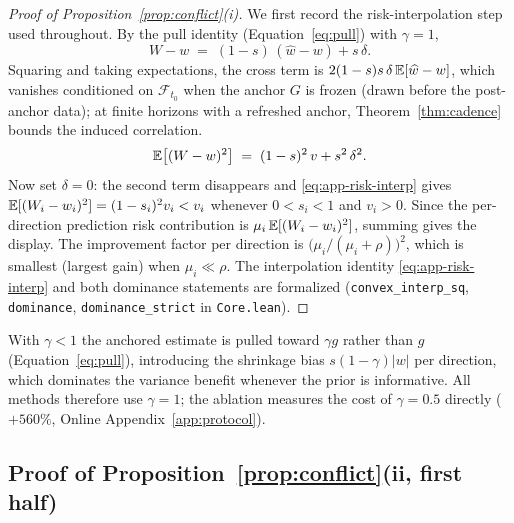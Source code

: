 \begin{proof}[Proof of Proposition~\ref{prop:conflict}(i)]
We first record the risk-interpolation step used throughout.
By the pull identity (Equation~\eqref{eq:pull}) with $\gamma = 1$,
\[
  W - w \;=\; (1 - s)\,(\widehat w - w) + s\,\delta .
\]
Squaring and taking expectations, the cross term is $2(1-s)s\,\delta\,\mathbb{E}[\widehat w - w]$, which vanishes conditioned on $\mathcal F_{t_0}$ when the anchor $G$ is frozen (drawn before the post-anchor data); at finite horizons with a refreshed anchor, Theorem~\ref{thm:cadence} bounds the induced correlation.
\begin{equation}
\label{eq:app-risk-interp}
  \mathbb{E}\bigl[(W - w)^2\bigr] \;=\; (1 - s)^2\,v + s^2\,\delta^2 .
\end{equation}
Now set $\delta = 0$: the second term disappears and \eqref{eq:app-risk-interp} gives $\mathbb{E}[(W_i - w_i)^2] = (1 - s_i)^2 v_i < v_i$ whenever $0 < s_i < 1$ and $v_i > 0$.
Since the per-direction prediction risk contribution is $\mu_i\,\mathbb{E}[(W_i - w_i)^2]$, summing gives the display.
The improvement factor per direction is $\bigl(\mu_i/(\mu_i + \rho)\bigr)^2$, which is smallest (largest gain) when $\mu_i \ll \rho$.
The interpolation identity \eqref{eq:app-risk-interp} and both dominance statements are formalized (\texttt{convex\_interp\_sq}, \texttt{dominance}, \texttt{dominance\_strict} in \texttt{Core.lean}).
\end{proof}

\begin{remark}[The $\gamma = 1$ design principle]
With $\gamma < 1$ the anchored estimate is pulled toward $\gamma g$ rather than $g$ (Equation~\eqref{eq:pull}), introducing the shrinkage bias $s(1-\gamma)|w|$ per direction, which dominates the variance benefit whenever the prior is informative.
All methods therefore use $\gamma = 1$; the ablation measures the cost of $\gamma = 0.5$ directly ($+560\%$, Online Appendix~\ref{app:protocol}).
\end{remark}

\subsection{Proof of Proposition~\ref{prop:conflict}(ii, first half)}
\label{app:proof-imperfect}



